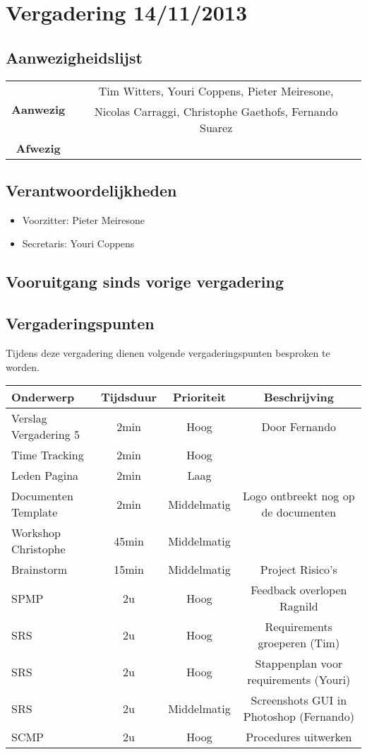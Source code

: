 \section{Vergadering 14/11/2013}
\subsection{Aanwezigheidslijst}
\begin{table}[htbp]
	\centering
	\begin{tabular}{c|c}
		\multirow{2}{*}{\textbf{Aanwezig}} & Tim Witters, Youri Coppens, Pieter Meiresone, \\
		& Nicolas Carraggi,  Christophe Gaethofs, Fernando Suarez\\
		\hline
		\textbf{Afwezig} & \\
	\end{tabular}
\end{table}

\subsection{Verantwoordelijkheden}
\begin{itemize}
	\item Voorzitter: Pieter Meiresone
	\item Secretaris: Youri Coppens
\end{itemize}

\subsection{Vooruitgang sinds vorige vergadering}
\subsection{Vergaderingspunten}
Tijdens deze vergadering dienen volgende vergaderingspunten besproken te worden.
\begin{table} [H]
	\centering
	\begin{tabular} {l|c|c|c}
		Onderwerp & Tijdsduur & Prioriteit & Beschrijving \\
		\hline
		Verslag Vergadering 5 & 2min & Hoog & Door Fernando \\
		Time Tracking & 2min & Hoog & \\
		Leden Pagina & 2min & Laag & \\
		Documenten Template & 2min & Middelmatig & Logo ontbreekt nog op de documenten \\
		Workshop Christophe & 45min & Middelmatig & \\
		Brainstorm & 15min & Middelmatig & Project Risico's \\
		SPMP & 2u & Hoog & Feedback overlopen Ragnild \\
		SRS & 2u & Hoog & Requirements groeperen (Tim) \\
		SRS & 2u & Hoog & Stappenplan voor requirements (Youri) \\
		SRS & 2u & Middelmatig & Screenshots GUI in Photoshop (Fernando) \\
		SCMP & 2u & Hoog & Procedures uitwerken \\
	\end{tabular}
\end{table}

